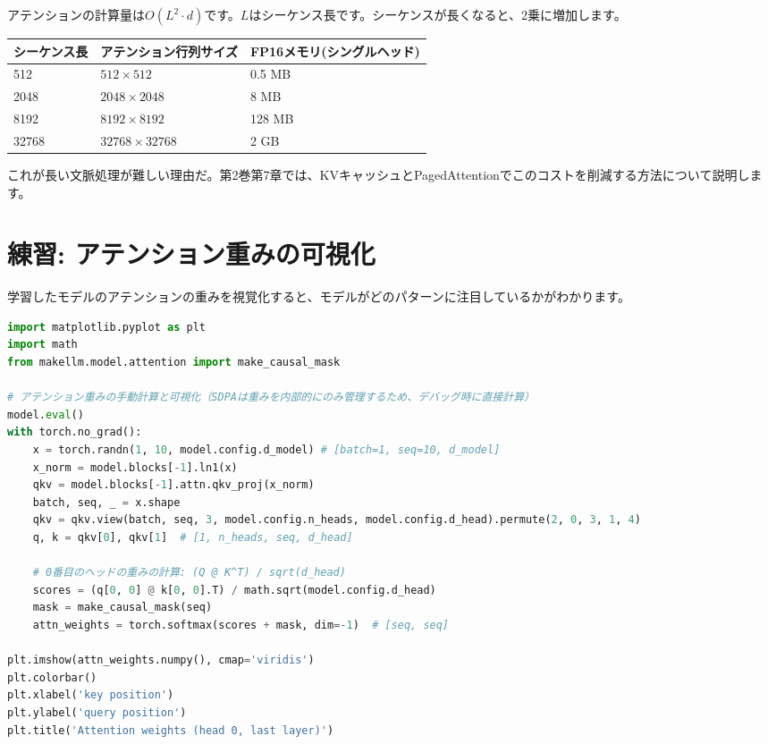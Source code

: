 アテンションの計算量は$O(L^2 \cdot d)$です。$L$はシーケンス長です。シーケンスが長くなると、2乗に増加します。

\begin{center}
\begin{tabularx}{\textwidth}{lXX}
\toprule
\textbf{シーケンス長}&\textbf{アテンション行列サイズ}&\textbf{FP16メモリ(シングルヘッド)}\\
\midrule
512 & $512 \times 512$ & 0.5 MB \\
2048 & $2048 \times 2048$ & 8 MB \\
8192 & $8192 \times 8192$ & 128 MB \\
32768 & $32768 \times 32768$ & 2 GB \\
\bottomrule
\end{tabularx}
\end{center}

これが長い文脈処理が難しい理由だ。第2巻第7章では、KVキャッシュとPagedAttentionでこのコストを削減する方法について説明します。

\section{練習: アテンション重みの可視化}

学習したモデルのアテンションの重みを視覚化すると、モデルがどのパターンに注目しているかがわかります。

\begin{lstlisting}[language=Python]
import matplotlib.pyplot as plt
import math
from makellm.model.attention import make_causal_mask

# アテンション重みの手動計算と可視化（SDPAは重みを内部的にのみ管理するため、デバッグ時に直接計算）
model.eval()
with torch.no_grad():
    x = torch.randn(1, 10, model.config.d_model) # [batch=1, seq=10, d_model]
    x_norm = model.blocks[-1].ln1(x)
    qkv = model.blocks[-1].attn.qkv_proj(x_norm)
    batch, seq, _ = x.shape
    qkv = qkv.view(batch, seq, 3, model.config.n_heads, model.config.d_head).permute(2, 0, 3, 1, 4)
    q, k = qkv[0], qkv[1]  # [1, n_heads, seq, d_head]
    
    # 0番目のヘッドの重みの計算: (Q @ K^T) / sqrt(d_head)
    scores = (q[0, 0] @ k[0, 0].T) / math.sqrt(model.config.d_head)
    mask = make_causal_mask(seq)
    attn_weights = torch.softmax(scores + mask, dim=-1)  # [seq, seq]

plt.imshow(attn_weights.numpy(), cmap='viridis')
plt.colorbar()
plt.xlabel('key position')
plt.ylabel('query position')
plt.title('Attention weights (head 0, last layer)')
\end{lstlisting}


